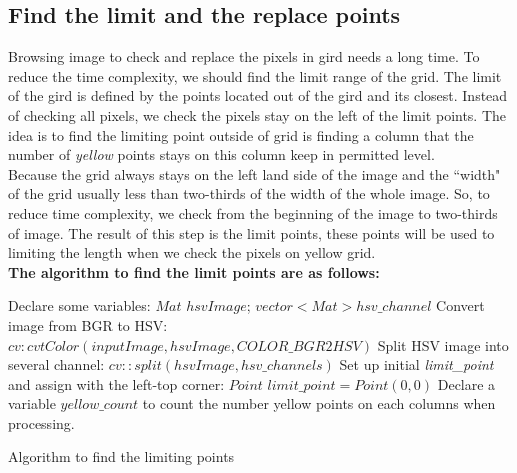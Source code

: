\subsection{Find the limit and the replace points}
Browsing image to check and replace the pixels in gird needs a long time. To reduce the time complexity, we should find the limit range of the grid. The limit of the gird is defined by the points located out of the gird and its closest. Instead of checking all pixels, we check the pixels stay on the left of the limit points. The idea is to find the limiting point outside of grid is finding a column that the number of \textit{yellow} points stays on this column keep in permitted level.\\
Because the grid always stays on the left land side of the image and the ``width" of the grid usually less than two-thirds of the width of the whole image. So, to reduce time complexity, we check from the beginning of the image to two-thirds of image. The result of this step is the limit points, these points will be used to limiting the length when we check the pixels on yellow grid.\\
\textbf{The algorithm to find the limit points are as follows:}\\
\begin{algorithm}[H]
\Indm
{}
\Indp
Declare some variables: $Mat$ $hsvImage$; $vector<Mat> hsv\_channel$\;
Convert image from BGR to HSV: $cv:cvtColor(inputImage, hsvImage, COLOR\_BGR2HSV)$ \;
Split HSV image into several channel: $cv::split(hsvImage, hsv\_channels)$\;
Set up initial \textit{limit\_point} and assign with the left-top corner: 
$Point$ $limit\_point = Point(0,0)$\;
Declare a variable $yellow\_count$ to count the number yellow points on each columns when processing.\;
\caption{Algorithm to find the limiting points}
\end{algorithm}~~\\
